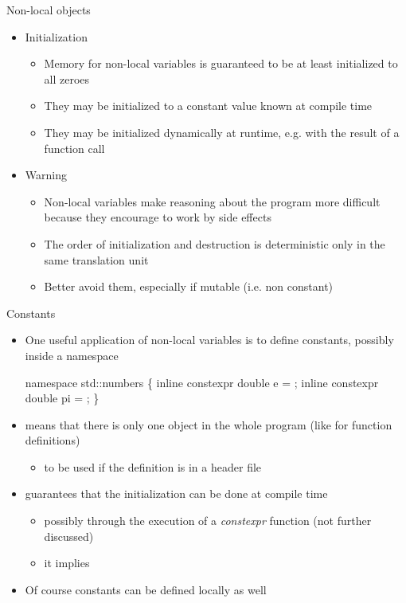 \begin{frame}[fragile]{Non-local objects \insertcontinuationtext}
  \begin{itemize}
  \item<1-> Initialization
    \begin{itemize}
    \item Memory for non-local variables is guaranteed to be at least
      initialized to all zeroes
    \item They may be initialized to a constant value known at compile time
    \item They may be initialized dynamically at runtime, e.g. with the result
      of a function call
    \end{itemize}
  \item<2-> Warning
    \begin{itemize}
    \item Non-local variables make reasoning about the program more difficult
      because they encourage to work by side effects
    \item The order of initialization and destruction is deterministic only in
      the same translation unit
    \item \alert{Better avoid them}, especially if mutable (i.e. non constant)
    \end{itemize}
  \end{itemize}
\end{frame}

\begin{frame}[fragile]{Constants}

  \begin{itemize}
  \item One useful application of non-local variables is to define constants,
    possibly inside a namespace
    \begin{codeblock}{
namespace std::numbers \{
  inline constexpr double e  = \ddd ;
  inline constexpr double pi = \ddd ;
  \ddd
\}
}\end{codeblock}
    \item<2->  means that there is only one object in the whole
      program (like for function definitions)
      \begin{itemize}
      \item<2-> to be used if the definition is in a header file
      \end{itemize}
    \item<2->  guarantees that the initialization can be done at
      compile time
    \begin{itemize}
    \item<2-> possibly through the execution of a \textit{constexpr} function
      (not further discussed)
    \item<2-> it implies 
    \end{itemize}
  \item<3->Of course constants can be defined locally as well
  \end{itemize}

\end{frame}

